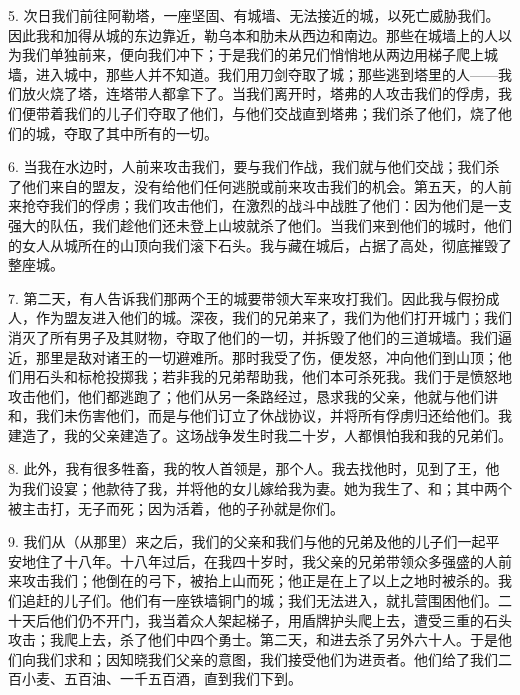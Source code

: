 5. 次日我们前往阿勒塔，一座坚固、有城墙、无法接近的城，以死亡威胁我们。因此我和加得从城的东边靠近，勒乌本和肋未从西边和南边。那些在城墙上的人以为我们单独前来，便向我们冲下；于是我们的弟兄们悄悄地从两边用梯子爬上城墙，进入城中，那些人并不知道。我们用刀剑夺取了城；那些逃到塔里的人——我们放火烧了塔，连塔带人都拿下了。当我们离开时，塔弗的人攻击我们的俘虏，我们便带着我们的儿子们夺取了他们，与他们交战直到塔弗；我们杀了他们，烧了他们的城，夺取了其中所有的一切。\par

6. 当我在水边时，人前来攻击我们，要与我们作战，我们就与他们交战；我们杀了他们来自的盟友，没有给他们任何逃脱或前来攻击我们的机会。第五天，的人前来抢夺我们的俘虏；我们攻击他们，在激烈的战斗中战胜了他们：因为他们是一支强大的队伍，我们趁他们还未登上山坡就杀了他们。当我们来到他们的城时，他们的女人从城所在的山顶向我们滚下石头。我与藏在城后，占据了高处，彻底摧毁了整座城。\par

7. 第二天，有人告诉我们那两个王的城要带领大军来攻打我们。因此我与假扮成人，作为盟友进入他们的城。深夜，我们的兄弟来了，我们为他们打开城门；我们消灭了所有男子及其财物，夺取了他们的一切，并拆毁了他们的三道城墙。我们逼近，那里是敌对诸王的一切避难所。那时我受了伤，便发怒，冲向他们到山顶；他们用石头和标枪投掷我；若非我的兄弟帮助我，他们本可杀死我。我们于是愤怒地攻击他们，他们都逃跑了；他们从另一条路经过，恳求我的父亲，他就与他们讲和，我们未伤害他们，而是与他们订立了休战协议，并将所有俘虏归还给他们。我建造了，我的父亲建造了。这场战争发生时我二十岁，人都惧怕我和我的兄弟们。\par

8. 此外，我有很多牲畜，我的牧人首领是，那个人。我去找他时，见到了王，他为我们设宴；他款待了我，并将他的女儿嫁给我为妻。她为我生了、和；其中两个被主击打，无子而死；因为活着，他的子孙就是你们。\par

9. 我们从（从那里）来之后，我们的父亲和我们与他的兄弟及他的儿子们一起平安地住了十八年。十八年过后，在我四十岁时，我父亲的兄弟带领众多强盛的人前来攻击我们；他倒在的弓下，被抬上山而死；他正是在上了以上之地时被杀的。我们追赶的儿子们。他们有一座铁墙铜门的城；我们无法进入，就扎营围困他们。二十天后他们仍不开门，我当着众人架起梯子，用盾牌护头爬上去，遭受三重的石头攻击；我爬上去，杀了他们中四个勇士。第二天，和进去杀了另外六十人。于是他们向我们求和；因知晓我们父亲的意图，我们接受他们为进贡者。他们给了我们二百小麦、五百油、一千五百酒，直到我们下到。\par

